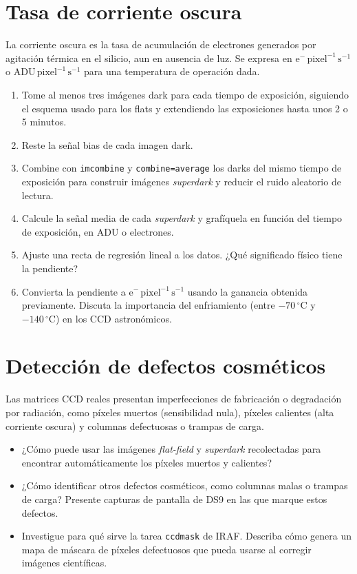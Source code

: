 \documentclass[12pt,a4paper]{article}
\begin{document}
\section{Tasa de corriente oscura}

La corriente oscura es la tasa de acumulación de electrones generados por
agitación térmica en el silicio, aun en ausencia de luz. Se expresa en
$\mathrm{e^-\,pixel^{-1}\,s^{-1}}$ o
$\mathrm{ADU\,pixel^{-1}\,s^{-1}}$ para una temperatura de operación dada.


\begin{enumerate}
    \item Tome al menos tres imágenes dark para cada tiempo de exposición,
    siguiendo el esquema usado para los flats y extendiendo las exposiciones
    hasta unos 2 o 5 minutos.
    \item Reste la señal bias de cada imagen dark.
    \item Combine con \texttt{imcombine} y \texttt{combine=average} los darks
    del mismo tiempo de exposición para construir imágenes \emph{superdark} y
    reducir el ruido aleatorio de lectura.
    \item Calcule la señal media de cada \emph{superdark} y grafíquela en
    función del tiempo de exposición, en ADU o electrones.
    \item Ajuste una recta de regresión lineal a los datos. ¿Qué significado
    físico tiene la pendiente?
    \item Convierta la pendiente a $\mathrm{e^-\,pixel^{-1}\,s^{-1}}$ usando
    la ganancia obtenida previamente. Discuta la importancia del enfriamiento
    (entre $-70\,^{\circ}\mathrm{C}$ y $-140\,^{\circ}\mathrm{C}$) en los CCD
    astronómicos.
\end{enumerate}


\section{Detección de defectos cosméticos}

Las matrices CCD reales presentan imperfecciones de fabricación o degradación
por radiación, como píxeles muertos (sensibilidad nula), píxeles calientes
(alta corriente oscura) y columnas defectuosas o trampas de carga.

\begin{itemize}
    \item ¿Cómo puede usar las imágenes \emph{flat-field} y \emph{superdark}
    recolectadas para encontrar automáticamente los píxeles muertos y
    calientes?
    \item ¿Cómo identificar otros defectos cosméticos, como columnas malas o
    trampas de carga? Presente capturas de pantalla de DS9 en las que marque
    estos defectos.
    \item Investigue para qué sirve la tarea \texttt{ccdmask} de IRAF. Describa
    cómo genera un mapa de máscara de píxeles defectuosos que pueda usarse al
    corregir imágenes científicas.
\end{itemize}
\end{document}
